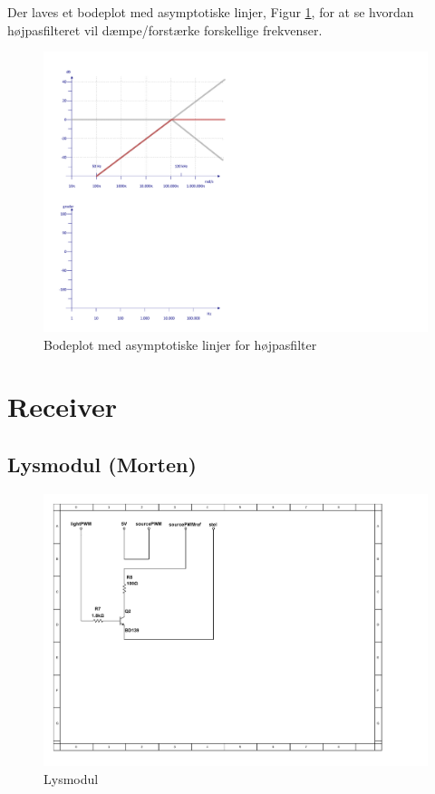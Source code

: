 Der laves et bodeplot med asymptotiske linjer, Figur \ref{fig:BodeHPF}, for at se hvordan højpasfilteret vil dæmpe/forstærke forskellige frekvenser.
\begin{figure}[h]
	\centering
	\includegraphics[scale=0.5, trim=50 420 560 50, clip=true]{../HardwareDesign/Diagrammer/BodePlotHPF.pdf}
	\caption{Bodeplot med asymptotiske linjer for højpasfilter}
	\label{fig:BodeHPF}
\end{figure}

\section{Receiver}

\subsection{Lysmodul (Morten)}

\begin{figure}[h]
	\centering
	\includegraphics[scale=0.8, trim=50 250 440 60, clip=true]{../HardwareDesign/Diagrammer/Lysmodul.pdf}
	\caption{Lysmodul}
	\label{fig:Lysmodul-kredslob}
\end{figure}


